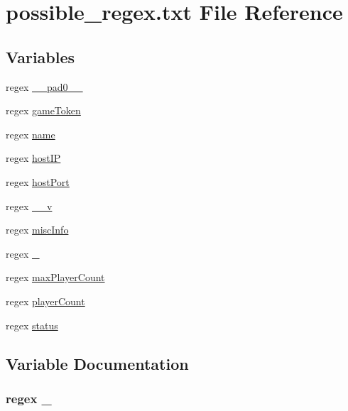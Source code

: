 \hypertarget{possible__regex_8txt}{}\section{possible\+\_\+regex.\+txt File Reference}
\label{possible__regex_8txt}
\subsection*{Variables}
\begin{DoxyCompactItemize}
\item 
regex \hyperlink{possible__regex_8txt_afb887fe7e1eb925dddebdd6c37469acf}{\+\_\+\+\_\+pad0\+\_\+\+\_\+}
\item 
regex \hyperlink{possible__regex_8txt_a0b01e37803111b7958253ef860537fb4}{game\+Token}
\item 
regex \hyperlink{possible__regex_8txt_a12059fd780adf4569fa057a334dc3124}{name}
\item 
regex \hyperlink{possible__regex_8txt_a90b83716a60a313fbd51c12d70dc4257}{host\+IP}
\item 
regex \hyperlink{possible__regex_8txt_a35fd16330f8dee35a458e891dc3b2971}{host\+Port}
\item 
regex \hyperlink{possible__regex_8txt_a79dbfa610c3be8c62100ac3aaae2325b}{\+\_\+\+\_\+v}
\item 
regex \hyperlink{possible__regex_8txt_a3a9f0844e2bf5afb0f0456725f8ad4f1}{misc\+Info}
\item 
regex \hyperlink{possible__regex_8txt_aac45023844f34d5fa258ecdcf5a56eb3}{\+\_\+}
\item 
regex \hyperlink{possible__regex_8txt_a3b0eb02dd264d21b8116f7d308cb45f0}{max\+Player\+Count}
\item 
regex \hyperlink{possible__regex_8txt_a40cafcc3051ae3ed3a65182e23a39ba9}{player\+Count}
\item 
regex \hyperlink{possible__regex_8txt_ab54d8f31128730da0057b64edcb8a59b}{status}
\end{DoxyCompactItemize}


\subsection{Variable Documentation}
\subsubsection[{\texorpdfstring{\+\_\+}{_}}]{\setlength{\rightskip}{0pt plus 5cm}regex \+\_\+}\hypertarget{possible__regex_8txt_aac45023844f34d5fa258ecdcf5a56eb3}{}\label{possible__regex_8txt_aac45023844f34d5fa258ecdcf5a56eb3}
